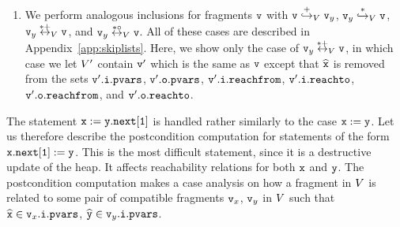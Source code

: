 \begin{enumerate}
\begin{itemize}
\end{itemize}
\item We perform analogous inclusions for fragments $\mathtt{v}$ with
  $\mathtt{v} \overset{+}\hookrightarrow_{V} \mathtt{v}_y$,
  $\mathtt{v}_y \overset{*}\hookrightarrow_{V} \mathtt{v}$,
  $\mathtt{v}_y \overset{*+}\leftrightarrow_{V} \mathtt{v}$, and
  $\mathtt{v}_y \overset{*\circ}\leftrightarrow_{V} \mathtt{v}$. All of these
  cases are described in Appendix~\ref{app:skiplists}.
Here,
  we show only the case of $\mathtt{v}_y \overset{*+}\leftrightarrow_{V} \mathtt{v}$,
  in which case we let $V'$ contain $\mathtt{v}'$ which is the same as $\mathtt{v}$ except that $\widehat{\mathtt{x}}$ is removed from the sets
$\mathtt{v}'.\mathtt{i}.\mathtt{pvars}$,
$\mathtt{v}'.\mathtt{o}.\mathtt{pvars}$,
$\mathtt{v}'.\mathtt{i}.\mathtt{reachfrom}$,
$\mathtt{v}'.\mathtt{i}.\mathtt{reachto}$,
$\mathtt{v}'.\mathtt{o}.\mathtt{reachfrom}$, and
$\mathtt{v}'.\mathtt{o}.\mathtt{reachto}$.
\end{enumerate}
The statement ${\tt x := y.next[1]}$ is handled rather similarly to the 
case ${\tt x := y}$.
Let us therefore describe the postcondition computation for statements of the form
${\tt x.next[1] := y}$.
This is the most difficult statement, since it is a destructive update of the heap. It affects reachability relations for both $\mathtt{x}$ and $\mathtt{y}$.
The postcondition computation makes a case analysis on how a fragment
in $V$ is related to some pair of compatible fragments $\mathtt{v}_x$, $\mathtt{v}_y$ in $V$ such that $\widehat{\mathtt{x}} \in \mathtt{v}_x.\mathtt{i}.\mathtt{pvars}$, $\widehat{\mathtt{y}} \in \mathtt{v}_y.\mathtt{i}.\mathtt{pvars}$. 
